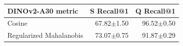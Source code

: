 \begin{tabular}{lrr}
\toprule
DINOv2-A30 metric & S Recall@1 & Q Recall@1 \\
\midrule
Cosine & 67.82$\pm$1.50 & 96.52$\pm$0.50 \\
Regularized Mahalanobis & 73.07$\pm$0.75 & 91.87$\pm$0.29 \\
\bottomrule
\end{tabular}
